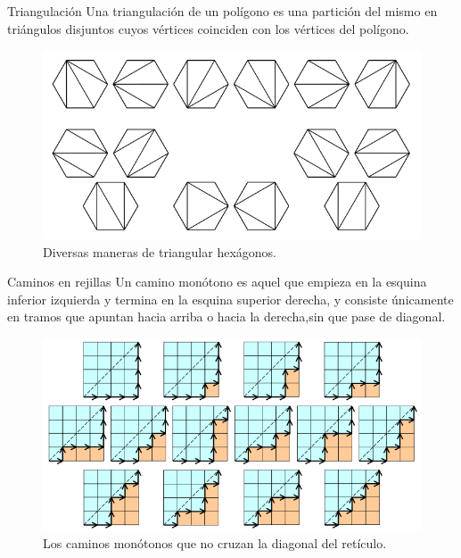 \begin{frame}
\frametitle{\subsubsecname}

\begin{minipage}{0.45\paperwidth}
	\begin{block}{Triangulación}
	Una triangulación de un polígono es una partición del mismo en triángulos disjuntos cuyos vértices coinciden con los vértices del polígono.
	\end{block}
	\begin{figure}
		\centering
		\includegraphics[width=0.4\paperwidth]{ca1}
		\caption{Diversas maneras de triangular hexágonos.}
	\end{figure}
\end{minipage}
\hfill
\begin{minipage}{0.45\paperwidth}
	\begin{block}{Caminos en rejillas}
		Un camino monótono es aquel que empieza en la esquina inferior izquierda y termina en la esquina superior derecha, y consiste únicamente en tramos que apuntan hacia arriba o hacia la derecha,sin que pase de diagonal.
	\end{block}
	\begin{figure}
		\centering
		\includegraphics[width=0.4\paperwidth]{ca(1)}
		\caption{Los caminos monótonos que no cruzan la diagonal del retículo.}
	\end{figure}
\end{minipage}
\end{frame}